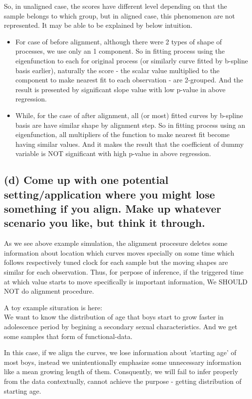 \documentclass{article}
\begin{document}
So, in unaligned case, the scores have different level depending on that the sample belongs to which group,
but in aligned case, this phenomenon are not represented.
It may be able to be explained by below intuition.

\begin{itemize}
    \item{For case of before alignment, although there were 2 types of shape of processes, we use only an 1 component.
    So in fitting process using the eigenfunction to each for original process (or similarly curve fitted by b-spline basis earlier),
    naturally the score - the scalar value multiplied to the component to make nearest fit to each observation - are 2-grouped. 
    And the result is presented by significant slope value with low p-value in above regression.}
    \item{While, for the case of after alignment, all (or most) fitted curves by b-spline basis are 
    have similar shape by alignment step. So in fitting process using an eigenfunction,
    all multipliers of the function to make nearest fit become having similar values.
    And it makes the result that the coefficient of dummy variable is NOT significant with high p-value in above regression.}
\end{itemize}




\subsection*{(d) Come up with one potential setting/application 
where you might lose something if you align. Make up whatever scenario you like, but think it through.}

As we see above example simulation, the alignment procesure deletes some information about location which
curves moves specially on some time which follows respectively tuned clock for each sample but the moving shapes are similar for each observation.
Thus, for perpose of inference, if the triggered time at which value starts to move specifically is important information, We SHOULD NOT do alignment procedure.


A toy example situration is here:\\
We want to know the distribution of age that boys start to grow faster in adolescence period 
by begining a secondary sexual characteristics. And we get some samples that form of functional-data.

In this case, if we align the curves, we lose information about 'starting age' of most boys, instead
we unintentionally emphasize some unnecessary information like a mean growing length of them.
Consquently, we will fail to infer properly from the data contextually, cannot achieve the purpose - getting distribution of starting age.
\end{document}
